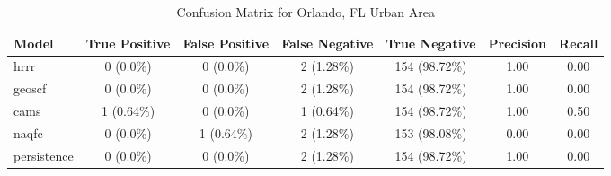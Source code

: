 \begin{table}[h!]
\centering
\begin{tabular}{lcccccc}
\hline
Model & True Positive & False Positive & False Negative & True Negative & Precision & Recall\\ \hline
hrrr & 0 (0.0\%) & 0 (0.0\%) & 2 (1.28\%) & 154 (98.72\%) & \cellcolor{green!25}1.00 & \cellcolor{green!25}0.00 \\ 
geoscf & 0 (0.0\%) & 0 (0.0\%) & 2 (1.28\%) & 154 (98.72\%) & \cellcolor{green!25}1.00 & \cellcolor{green!25}0.00 \\ 
cams & 1 (0.64\%) & 0 (0.0\%) & 1 (0.64\%) & 154 (98.72\%) & \cellcolor{green!25}1.00 & \cellcolor{green!25}0.50 \\ 
naqfc & 0 (0.0\%) & 1 (0.64\%) & 2 (1.28\%) & 153 (98.08\%) & \cellcolor{red!25}0.00 & \cellcolor{green!25}0.00 \\ 
persistence & 0 (0.0\%) & 0 (0.0\%) & 2 (1.28\%) & 154 (98.72\%) & 1.00 & 0.00 \\ 
\hline
\end{tabular}
\caption{Confusion Matrix for Orlando, FL Urban Area}
\end{table}
